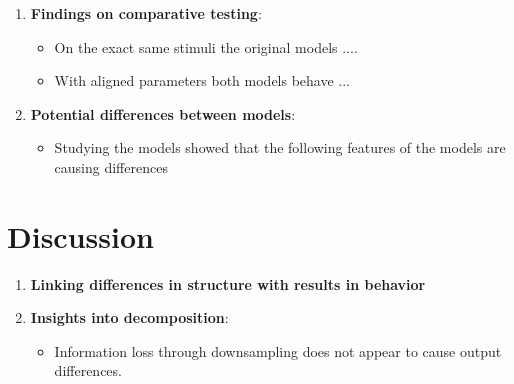 \begin{enumerate}
    \item \textbf{Findings on comparative testing}:
    \begin{itemize}
        \item On the exact same stimuli the original models ....
        \item With aligned parameters both models behave ...
    \end{itemize}

    \item \textbf{Potential differences between models}:
    \begin{itemize}
        \item Studying the models showed that the following features of the models are causing differences
    \end{itemize}
\end{enumerate}

\newpage

\section{Discussion} 
\begin{enumerate}
    \item \textbf{Linking differences in structure with results in behavior}
    \item \textbf{Insights into decomposition}:
    \begin{itemize}
        \item Information loss through downsampling does not appear to cause output differences.
    \end{itemize}
\end{enumerate}



\newpage
\nocite{Adelson1996}
\nocite{Brainard2003-BRACCD-2}
\nocite{Hanson1978}
\nocite{Murray2021}
\nocite{Kingdom2014}
\nocite{Robinson2007}
\vspace*{1cm}
\begin{minipage}{1\textwidth}
\printbibliography
\end{minipage}



